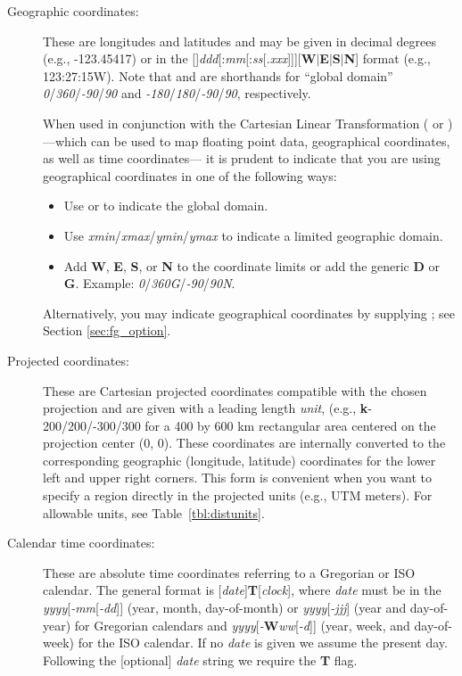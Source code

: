 \begin{description}
\item [Geographic coordinates:]  These are longitudes and latitudes and may be given in decimal degrees (e.g., -123.45417)
or in the
[\PM]\emph{ddd}[:\emph{mm}[:\emph{ss}[\emph{.xxx}]]][\textbf{W}$|$\textbf{E}$|$\textbf{S}$|$\textbf{N}]
format (e.g., 123:27:15W).  Note that  and  are shorthands for ``global domain''
\emph{0}/\emph{360}/\emph{-90}/\emph{90}
and  \emph{-180}/\emph{180}/\emph{-90}/\emph{90}, respectively.

When used in conjunction with the Cartesian Linear Transformation ( or ) ---which can be used
to map floating point data, geographical coordinates, as well as time coordinates--- it is prudent to indicate
that you are using geographical coordinates in one of the following ways:
\begin{itemize}
\item Use  or  to indicate the global domain.
\item Use \emph{xmin}/\emph{xmax}/\emph{ymin}/\emph{ymax} to indicate a limited geographic domain.
\item Add \textbf{W}, \textbf{E}, \textbf{S}, or \textbf{N} to the coordinate limits or add the generic \textbf{D} or
\textbf{G}. Example: \emph{0}/\emph{360G}/\emph{-90}/\emph{90N}.
\end{itemize}
Alternatively, you may indicate geographical coordinates by supplying ; see Section \ref{sec:fg_option}.

\item [Projected coordinates:]  These are Cartesian projected coordinates compatible with the chosen
projection and are given with a leading length \emph{unit}, (e.g., {\bf k}-200/200/-300/300 for a 400 by 600 km
rectangular area centered on the projection center (0, 0).  These coordinates are internally converted
to the corresponding geographic (longitude, latitude) coordinates for the lower left and upper right corners.
This form is convenient when you want to specify a region directly in the projected units (e.g., UTM meters).
For allowable units, see Table~\ref{tbl:distunits}.

\item [Calendar time coordinates:]  These are absolute time coordinates referring to a Gregorian or ISO calendar.
The general format is [\emph{date}]\textbf{T}[\emph{clock}], where \emph{date} must be in the
\emph{yyyy}[\emph{-mm}[\emph{-dd}]] (year, month, day-of-month)
or \emph{yyyy}[\emph{-jjj}] (year and day-of-year) for Gregorian calendars and
\emph{yyyy}[\emph{-}\textbf{W}\emph{ww}[\emph{-d}]] (year, week, and
day-of-week) for the ISO calendar.  If no \emph{date} is given we assume the present day.  Following the
[optional] \emph{date} string we require the \textbf{T} flag.


\end{description}
